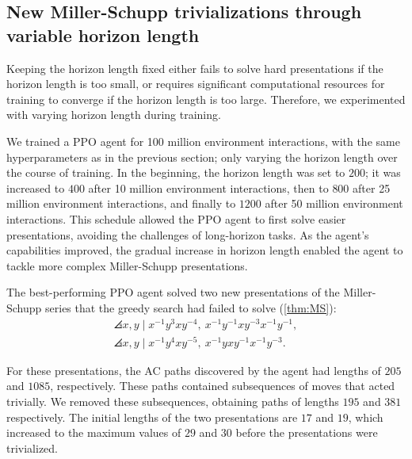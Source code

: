 \subsection{New Miller-Schupp trivializations through variable horizon length}\label{sec:variable_horizon}

Keeping the horizon length fixed either fails to solve hard presentations if the horizon length is too small, or requires significant computational resources for training to converge if the horizon length is too large. Therefore, we experimented with varying horizon length during training. 

We trained a PPO agent for 100 million environment interactions, with the same hyperparameters as in the previous section; only varying the horizon length over the course of training. In the beginning, the horizon length was set to $200$; it was increased to $400$ after 10 million environment interactions, then to $800$ after 25 million environment interactions, and finally to $1200$ after 50 million environment interactions.
This schedule allowed the PPO agent to first solve easier presentations, avoiding the challenges of long-horizon tasks. As the agent’s capabilities improved, the gradual increase in horizon length enabled the agent to tackle more complex Miller-Schupp presentations.

The best-performing PPO agent solved two new presentations of the Miller-Schupp series that the greedy search had failed to solve (\autoref{thm:MS}):
	\begin{gather*}
		\angles{x, y \mid x^{-1} y^3 x y^{-4} , \ x^{-1} y^{-1} x y^{-3} x^{-1} y^{-1}}, \\
		\angles{x, y \mid x^{-1} y^4 x y^{-5} , \ x^{-1} y x y^{-1} x^{-1} y^{-3}}.
	\end{gather*}

For these presentations, the AC paths discovered by the agent had lengths of $205$ and $1085$, respectively. These paths contained subsequences of moves that acted trivially. We removed these subsequences, obtaining paths of lengths $195$ and $381$ respectively. The initial lengths of the two presentations are $17$ and $19$, which increased to the maximum values of $29$ and $30$ before the presentations were trivialized. 

